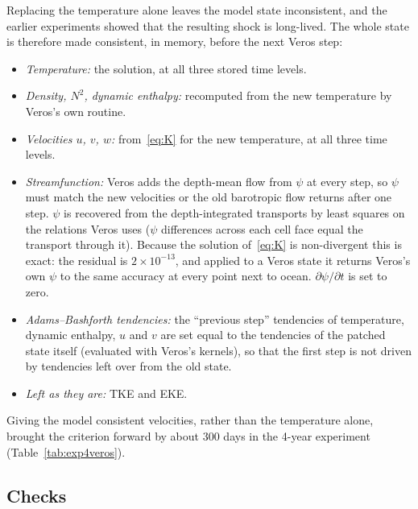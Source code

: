 \documentclass{article}
\begin{document}
Replacing the temperature alone leaves the model state inconsistent, and the earlier experiments showed that the resulting shock is long-lived. The whole state is therefore made consistent, in memory, before the next Veros step:
\begin{itemize}
\item \emph{Temperature:} the solution, at all three stored time levels.
\item \emph{Density, $N^2$, dynamic enthalpy:} recomputed from the new temperature by Veros's own routine.
\item \emph{Velocities $u$, $v$, $w$:} from~\eqref{eq:K} for the new temperature, at all three time levels.
\item \emph{Streamfunction:} Veros adds the depth-mean flow from $\psi$ at every step, so $\psi$ must match the new velocities or the old barotropic flow returns after one step. $\psi$ is recovered from the depth-integrated transports by least squares on the relations Veros uses ($\psi$ differences across each cell face equal the transport through it). Because the solution of~\eqref{eq:K} is non-divergent this is exact: the residual is $2\times10^{-13}$, and applied to a Veros state it returns Veros's own $\psi$ to the same accuracy at every point next to ocean. $\partial\psi/\partial t$ is set to zero.
\item \emph{Adams--Bashforth tendencies:} the ``previous step'' tendencies of temperature, dynamic enthalpy, $u$ and $v$ are set equal to the tendencies of the patched state itself (evaluated with Veros's kernels), so that the first step is not driven by tendencies left over from the old state.
\item \emph{Left as they are:} TKE and EKE.
\end{itemize}
Giving the model consistent velocities, rather than the temperature alone, brought the criterion forward by about 300 days in the 4-year experiment (Table~\ref{tab:exp4veros}).

\subsection{Checks}\label{sec:checks}
\end{document}

